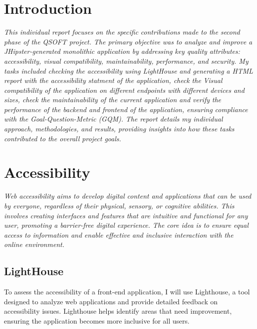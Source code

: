 \documentclass[a4paper,11pt,openright,BCOR=15mm]{scrbook}
\begin{document}
	\cleardoublepage
	

	
	
	
	\tableofcontents
	\listoffigures
	
	
	
	
	\mainmatter 
	
	

	\chapter{Introduction}
	
\textit{This individual report focuses on the specific contributions made to the second phase of the QSOFT project. The primary objective was to analyze and improve a JHipster-generated monolithic application by addressing key quality attributes: accessibility, visual compatibility, maintainability, performance, and security. My tasks included checking the accessibility using LightHouse and generating a HTML report with the accessibility statment of the application, check the Visual compatibility of the application on different endpoints with different devices and sizes, check the maintainability of the current application and verify the performance of the backend and frontend of the application, ensuring compliance with the Goal-Question-Metric (GQM). The report details my individual approach, methodologies, and results, providing insights into how these tasks contributed to the overall project goals.}
	
\chapter{Accessibility}

\textit{Web accessibility aims to develop digital content and applications that can be used by everyone, regardless of their physical, sensory, or cognitive abilities. This involves creating interfaces and features that are intuitive and functional for any user, promoting a barrier-free digital experience. The core idea is to ensure equal access to information and enable effective and inclusive interaction with the online environment.}
		
\section{LightHouse}
To assess the accessibility of a front-end application, I will use Lighthouse, a tool designed to analyze web applications and provide detailed feedback on accessibility issues. Lighthouse helps identify areas that need improvement, ensuring the application becomes more inclusive for all users.
\end{document}
